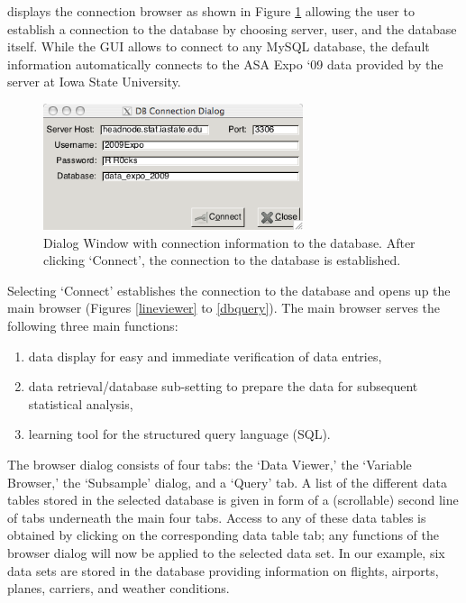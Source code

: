 \documentclass[11pt]{tise_style}
\begin{document}
displays the connection browser as shown in Figure  \ref{dbconnect} allowing the user to establish a connection to the database by choosing server, user, and the database itself. While the GUI allows to connect to any MySQL database, the default information automatically connects to the ASA Expo `09 data provided by the server at Iowa State University. \\[.25cm]



\begin{figure}[htbp] %
   \centering
   \includegraphics[width=3in]{dbconnect-dialog.png} 
   \caption{Dialog Window with connection information to the database. After clicking `Connect', the connection to the database is established.}
   \label{dbconnect}
\end{figure}



Selecting `Connect' establishes the connection to the database and opens up the main browser (Figures \ref{lineviewer} to \ref{dbquery}).  The main browser serves the following three main functions:
\begin{enumerate}
\item data display for easy and immediate verification of data entries, 
\item data retrieval/database sub-setting to prepare the data for subsequent statistical analysis, 
\item learning tool for the structured query language (SQL).
\end{enumerate}

The browser dialog consists of four tabs: the `Data Viewer,' the `Variable Browser,' the `Subsample' dialog, and a `Query' tab.  A list of the different data tables stored in the selected database is given in form of a (scrollable) second line of tabs underneath the main four tabs. Access to any of these data tables is obtained  by clicking on the corresponding data table tab; any functions of the browser dialog will now be applied to the selected data set. In our example, six data sets are stored in the database  providing information on flights, airports, planes, carriers, and weather conditions. 
\end{document}
